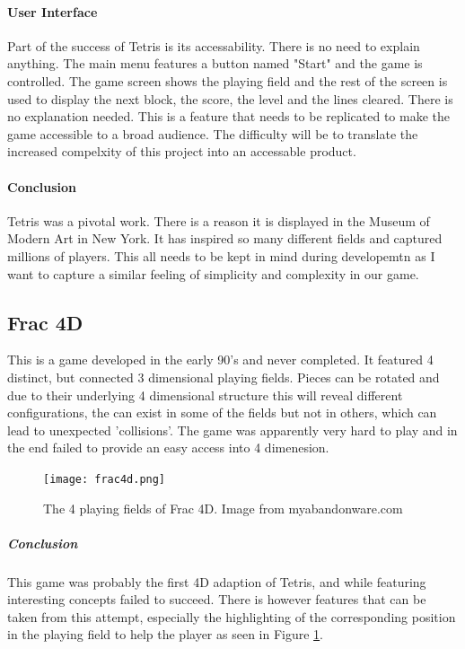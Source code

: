\documentclass{article}
\begin{document}
\paragraph{User Interface}
Part of the success of Tetris is its accessability. There is no need to explain anything. The main menu features a button named "Start" and the game is controlled. The game screen shows the playing field and the rest of the screen is used to display the next block, the score, the level and the lines cleared. 
There is no explanation needed. This is a feature that needs to be replicated to make the game accessible to a broad audience. The difficulty will be to translate the increased compelxity of this project into an accessable product.
\paragraph{Conclusion}
Tetris was a pivotal work. There is a reason it is displayed in the Museum of Modern Art in New York. It has inspired so many different fields and captured millions of players. This all needs to be kept in mind during developemtn as I want to capture a similar feeling of simplicity and complexity in our game.


\subsection{Frac 4D}
This is a game developed in the early 90's and never completed. It featured 4 distinct, but connected 3 dimensional playing fields. Pieces can be rotated and due to their underlying 4 dimensional structure this will reveal different configurations, the can exist in some of the fields but not in others, which can lead to unexpected 'collisions'. The game was apparently very hard to play and in the end failed to provide an easy access into 4 dimenesion.
\begin{figure}
    \label{fig:frac4d}
    \centering
    \texttt{[image: frac4d.png]}
    \caption{The 4 playing fields of Frac 4D. Image from myabandonware.com}
\end{figure}

\subparagraph*{Conclusion}
This game was probably the first 4D adaption of Tetris, and while featuring interesting concepts failed to succeed. There is however features that can be taken from this attempt, especially the highlighting of the corresponding position in the playing field to help the player as seen in Figure \ref{fig:frac4d}.
\end{document}
